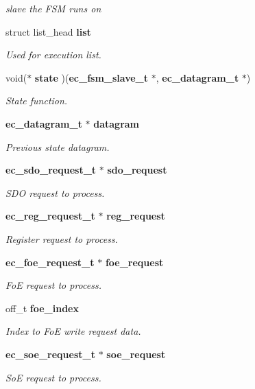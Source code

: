 \begin{DoxyCompactItemize}
\begin{DoxyCompactList}\small\item\em slave the F\-S\-M runs on \end{DoxyCompactList}\item 
struct list\-\_\-head {\bf list}
\begin{DoxyCompactList}\small\item\em Used for execution list. \end{DoxyCompactList}\item 
void($\ast$ {\bf state} )({\bf ec\-\_\-fsm\-\_\-slave\-\_\-t} $\ast$, {\bf ec\-\_\-datagram\-\_\-t} $\ast$)
\begin{DoxyCompactList}\small\item\em State function. \end{DoxyCompactList}\item 
{\bf ec\-\_\-datagram\-\_\-t} $\ast$ {\bf datagram}
\begin{DoxyCompactList}\small\item\em Previous state datagram. \end{DoxyCompactList}\item 
{\bf ec\-\_\-sdo\-\_\-request\-\_\-t} $\ast$ {\bf sdo\-\_\-request}
\begin{DoxyCompactList}\small\item\em S\-D\-O request to process. \end{DoxyCompactList}\item 
{\bf ec\-\_\-reg\-\_\-request\-\_\-t} $\ast$ {\bf reg\-\_\-request}
\begin{DoxyCompactList}\small\item\em Register request to process. \end{DoxyCompactList}\item 
{\bf ec\-\_\-foe\-\_\-request\-\_\-t} $\ast$ {\bf foe\-\_\-request}
\begin{DoxyCompactList}\small\item\em Fo\-E request to process. \end{DoxyCompactList}\item 
off\-\_\-t {\bf foe\-\_\-index}
\begin{DoxyCompactList}\small\item\em Index to Fo\-E write request data. \end{DoxyCompactList}\item 
{\bf ec\-\_\-soe\-\_\-request\-\_\-t} $\ast$ {\bf soe\-\_\-request}
\begin{DoxyCompactList}\small\item\em So\-E request to process. \end{DoxyCompactList}\item 

\end{DoxyCompactItemize}
